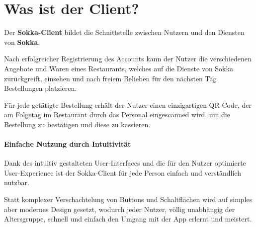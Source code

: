 \section{Was ist der Client?}

Der \textbf{Sokka-Client} bildet die Schnittstelle zwischen Nutzern und den Diensten von
\textbf{Sokka}.

Nach erfolgreicher Registrierung des Accounts kann der Nutzer die verschiedenen Angebote und
Waren eines Restaurants, welches auf die Dienste von Sokka zurückgreift, einsehen und nach freiem
Belieben für den nächsten Tag Bestellungen platzieren.

Für jede getätigte Bestellung erhält der Nutzer einen einzigartigen QR-Code, der am
Folgetag im Restaurant durch das Personal eingescanned wird, um die Bestellung zu bestätigen 
und diese zu kassieren.

\paragraph{Einfache Nutzung durch Intuitivität} Dank des intuitiv gestalteten User-Interfaces
und die für den Nutzer optimierte User-Experience ist der Sokka-Client für jede Person einfach
und verständlich nutzbar.

Statt komplexer Verschachtelung von Buttons und Schaltflächen wird auf simples aber modernes 
Design gesetzt, wodurch jeder Nutzer, völlig unabhängig der Altersgruppe, schnell und einfach den
Umgang mit der App erlernt und meistert.





